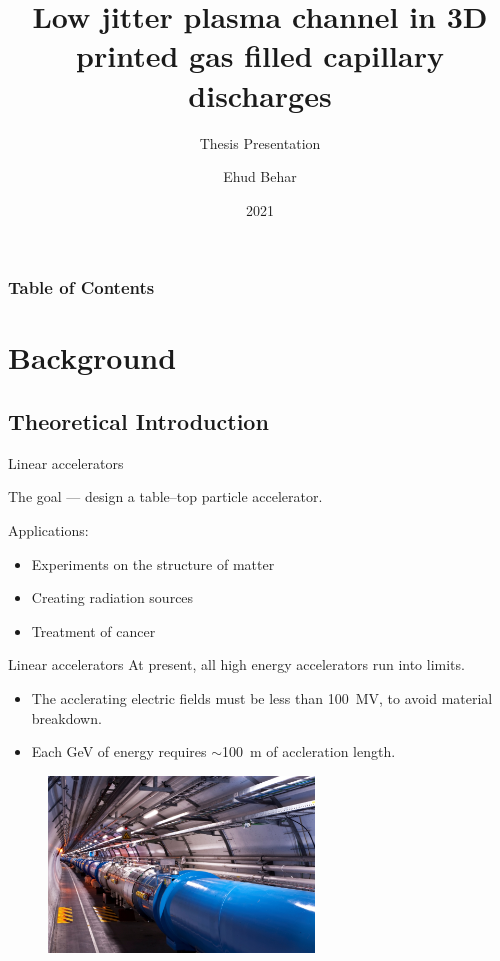 \documentclass[]{beamer}
\title{Low jitter plasma channel in 3D printed gas filled capillary discharges}
\subtitle{Thesis Presentation}
\author{Ehud Behar}
\institute{Hebrew University of Jerusalem}
\date{2021}
\begin{document}
\frame{\titlepage}
\begin{frame}
\frametitle{Table of Contents}
\tableofcontents
\end{frame}

\section{Background}
\subsection{Theoretical Introduction}
  \begin{frame}{Linear accelerators}
  \begin{center}
    The goal --- design a table--top particle accelerator.
  \end{center}
    Applications:
    \begin{itemize}
        \item[\textbullet] Experiments on the structure of matter
        \item[\textbullet] Creating radiation sources
        \item[\textbullet] Treatment of cancer
    \end{itemize}
  \end{frame}

  \begin{frame}{Linear accelerators}
    At present, all high energy accelerators run into limits.
    \begin{itemize}
        \item[\textbullet] The acclerating electric fields must be less than \SI{100}{\mega \V}, to avoid material breakdown.
        \item[\textbullet] Each \si{\giga \eV} of energy requires $\sim$\SI{100}{\meter} of accleration length.
    \end{itemize}
    \begin{figure}
      \includegraphics[width=200pt]{figures/lhc_cern_compressed.jpg}
    \end{figure}
  \end{frame}
\end{document}
